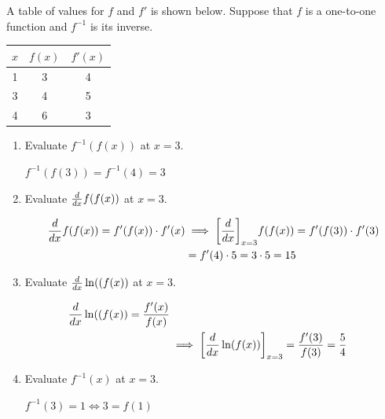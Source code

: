 \documentclass[nooutcomes]{ximera}
\begin{document}
\begin{problem}
  A table of values for $f$ and $f'$ is shown below.
  Suppose that $f$ is a one-to-one function and $f^{-1}$ is its inverse.
  \begin{center}
    \begin{tabular}{ccc}
\hline
      $x$ & $f(x)$ & $f'(x)$\\
\hline \hline
      1 & 3 & 4\\

      3 & 4 & 5\\

      4 & 6 & 3\\
\hline
    \end{tabular}
  \end{center}

  \begin{enumerate}
    \item Evaluate $f^{-1}(f(x))$ at $x = 3$.
      \begin{freeResponse}
         $ f^{-1}(f(3)) = f^{-1}(4) = 3$
      \end{freeResponse}


    \item Evaluate $\frac{d}{dx} f(f(x))$ at $x = 3$.
      \begin{freeResponse}

        \begin{align*}
          \frac{d}{dx} f(f(x)) = f'(f(x)) \cdot f'(x) &\implies \bigg[ \frac{d}{dx} \bigg]_{x = 3} f(f(x)) = f'(f(3)) \cdot f'(3)\\
          &= f'(4) \cdot 5 = 3 \cdot 5 = 15
        \end{align*}
      \end{freeResponse}


    \item Evaluate $\frac{d}{dx}\ln((f(x))$ at $x = 3$.
      \begin{freeResponse}

        \begin{align*}
          \frac{d}{dx}\ln((f(x)) = \frac{f'(x)}{f(x)} \\
          &\implies \bigg[ \frac{d}{dx} \ln(f(x)) \bigg]_{x = 3} = \frac{f'(3)}{f(3)} = \frac{5}{4}
        \end{align*}
      \end{freeResponse}


    \item Evaluate $f^{-1}(x)$ at $x = 3$.
      \begin{freeResponse}
	$ f^{-1}(3) = 1 \iff 3 = f(1)$
      \end{freeResponse}



\end{enumerate}
\end{problem}
\end{document}

